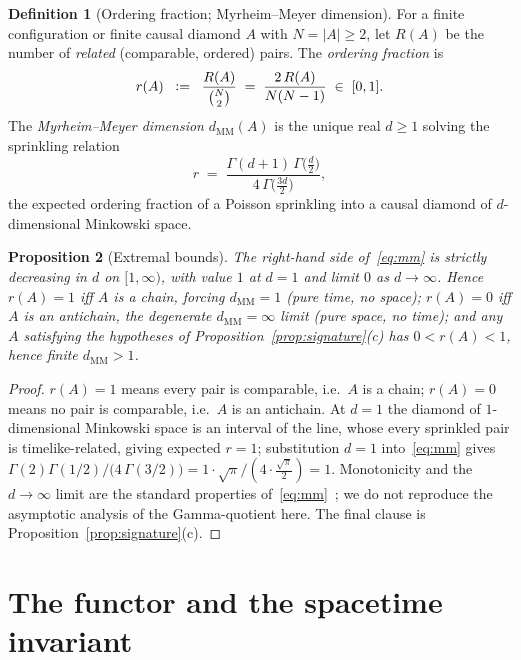 \documentclass[11pt]{article}
\theoremstyle{definition}
\newtheorem{definition}{Definition}[section]
\theoremstyle{plain}
\newtheorem{proposition}[definition]{Proposition}
\newcommand{\defeq}{\;\mathrel{\vcentcolon=}\;}
\theoremstyle{remark}
\begin{document}
\begin{definition}[Ordering fraction; Myrheim--Meyer dimension]
\label{def:dimension}
For a finite configuration or finite causal diamond $A$ with $N = |A|
\ge 2$, let $R(A)$ be the number of \emph{related} (comparable, ordered)
pairs. The \emph{ordering fraction} is
\[
  r(A) \;\defeq\; \frac{R(A)}{\binom{N}{2}}
              \;=\; \frac{2\,R(A)}{N(N-1)} \;\in\; [0,1].
\]
The \emph{Myrheim--Meyer dimension} $d_{\mathrm{MM}}(A)$ is the unique
real $d \ge 1$ solving the sprinkling relation~\cite{Myrheim,MeyerThesis}
\begin{equation}
\label{eq:mm}
  r \;=\; \frac{\Gamma(d+1)\,\Gamma\!\bigl(\tfrac d2\bigr)}
               {4\,\Gamma\!\bigl(\tfrac{3d}{2}\bigr)},
\end{equation}
the expected ordering fraction of a Poisson sprinkling into a causal
diamond of $d$-dimensional Minkowski space.
\end{definition}

\begin{proposition}[Extremal bounds]
\label{prop:dimbounds}
The right-hand side of~\eqref{eq:mm} is strictly decreasing in $d$ on
$[1,\infty)$, with value $1$ at $d=1$ and limit $0$ as $d\to\infty$.
Hence $r(A)=1$ iff $A$ is a chain, forcing $d_{\mathrm{MM}}=1$ (pure
time, no space); $r(A)=0$ iff $A$ is an antichain, the degenerate
$d_{\mathrm{MM}}=\infty$ limit (pure space, no time); and any $A$
satisfying the hypotheses of Proposition~\ref{prop:signature}(c) has
$0 < r(A) < 1$, hence finite $d_{\mathrm{MM}} > 1$.
\end{proposition}

\begin{proof}
$r(A)=1$ means every pair is comparable, i.e.\ $A$ is a chain; $r(A)=0$
means no pair is comparable, i.e.\ $A$ is an antichain. At $d=1$
the diamond of $1$-dimensional Minkowski space is an interval of the
line, whose every sprinkled pair is timelike-related, giving expected
$r=1$; substitution $d=1$ into~\eqref{eq:mm} gives $\Gamma(2)\Gamma(1/2)
/\bigl(4\,\Gamma(3/2)\bigr) = 1\cdot\sqrt\pi/(4\cdot\tfrac{\sqrt\pi}{2})
= 1$. Monotonicity and the $d\to\infty$ limit are the standard
properties of~\eqref{eq:mm}~\cite{MeyerThesis}; we do not reproduce the
asymptotic analysis of the Gamma-quotient here. The final clause is
Proposition~\ref{prop:signature}(c).
\end{proof}

\section{The functor and the spacetime invariant}
\label{sec:functor}
\end{document}
